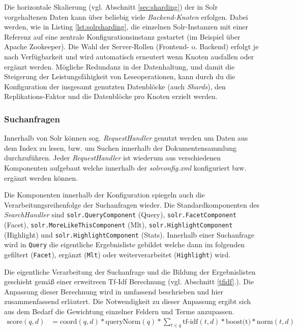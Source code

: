 

Die horizontale Skalierung (vgl. Abschnitt \ref{sec:sharding}) der in Solr vorgehaltenen Daten kann über beliebig viele \textit{Backend-Knoten} erfolgen. Dabei werden, wie in Listing \ref{lst:solrsharding}, die einzelnen Solr-Instanzen mit einer Referenz auf eine zentrale Konfigurationsinstanz gestartet (im Beispiel über Apache Zookeeper). Die Wahl der Server-Rollen (Frontend- o. Backend) erfolgt je nach Verfügbarkeit und wird automatisch erneutert wenn Knoten ausfallen oder ergänzt werden. Mögliche Redundanz in der Datenhaltung, und damit die Steigerung der Leistungsfähigkeit von Leseoperationen, kann durch du die Konfiguration der insgesamt genutzten Datenblöcke (auch \textit{Shards}), den Replikations-Faktor und die Datenblöcke pro Knoten erzielt werden.

\subsubsection{Suchanfragen}

Innerhalb von Solr können sog. \textit{RequestHandler} genutzt werden um Daten aus dem Index zu lesen, bzw. um Suchen innerhalb der Dokumentensammlung durchzuführen. Jeder \textit{RequestHandler} ist wiederum aus verschiedenen Komponenten aufgebaut welche innerhalb der \textit{solrconfig.xml} konfiguriert bzw. ergänzt werden können.

Die Komponenten innerhalb der Konfiguration spiegeln auch die Verarbeitungsreihenfolge der Suchanfragen wieder. Die Standardkomponenten des \textit{SearchHandler} sind \texttt{solr.QueryComponent} (Query), \texttt{solr.FacetComponent} (Facet), \texttt{solr.MoreLikeThisComponent} (Mlt), \texttt{solr.HighlightComponent} (Highlight) und \texttt{solr.HighlightComponent} (Stats). Innerhalb einer Suchanfrage wird in \texttt{Query} die eigentliche Ergebnisliste gebildet welche dann im folgenden gefiltert (\texttt{Facet}), ergänzt (\texttt{Mlt}) oder weiterverarbeitet (\texttt{Highlight}) wird.

Die eigentliche Verarbeitung der Suchanfrage und die Bildung der Ergebnislisten geschieht gemäß einer erweitreen Tf-Idf Berechnung (vgl. Abschnitt \ref{tfidf}.). Die Anpassung dieser Berechnung wird in \citep{TFIDFSimilarity} umfassend beschrieben und hier zusammenfassend erläutert. Die Notwendigkeit zu dieser Anpassung ergibt sich aus dem Bedarf die Gewichtung einzelner Feldern und Terme anzupassen.
\begin{align}
\text{score}(q, d) & = \text{coord}(q,d) \ast \text{queryNorm}(q) \ast \sum_{t \in q}{\text{tf-idf}(t, d) \ast \text{boost(t)} \ast \text{norm}(t,d)} \label{lucenedocscore}
\end{align}

